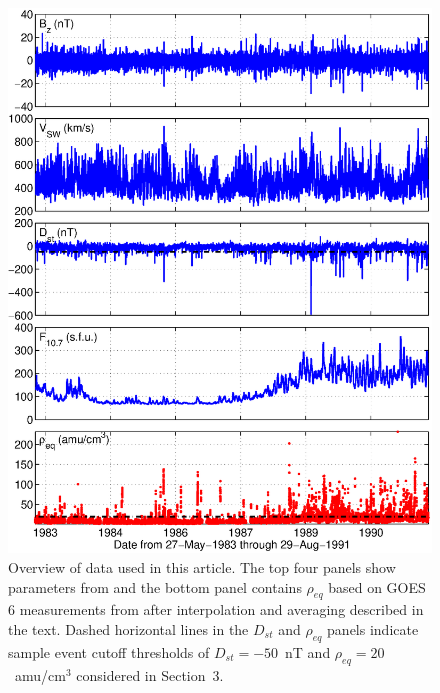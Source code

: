 \documentclass[12pt]{article}
\providecommand{\DIFaddbeginFL}{} %
\providecommand{\DIFaddendFL}{} %
\providecommand{\DIFdelbeginFL}{} %
\providecommand{\DIFdelendFL}{} %
\begin{document}
\begin{figure}[htp!]
\centering
\DIFdelbeginFL %
\DIFdelendFL \DIFaddbeginFL \includegraphics[scale=0.45]{UsedFigures/2016SW001507R-p01.eps}
\DIFaddendFL \caption{Overview of data used in this article. The top four panels show parameters from \cite{Kondrashov2014ReconstructionOfGaps} and the bottom panel contains $\rho_{eq}$ based on GOES 6 measurements from \cite{Denton} after interpolation and averaging described in the text. Dashed horizontal lines in the $D_{st}$ and $\rho_{eq}$ panels indicate sample event cutoff thresholds of $D_{st} = -50$~nT and $\rho_{eq} = 20$~amu/cm$^3$ considered in Section~3.}
\label{fig:AllData}
\end{figure}

\clearpage
\end{document}
